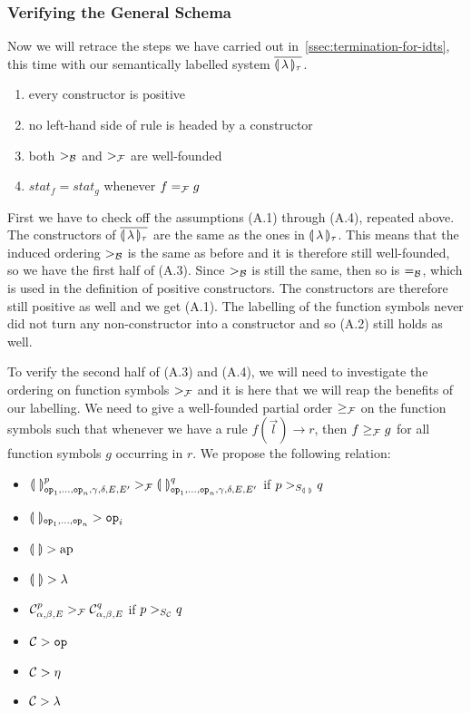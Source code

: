 \subsubsection{Verifying the General Schema}
\label{sssec:general-schema-2}

Now we will retrace the steps we have carried out
in~\ref{ssec:termination-for-idts}, this time with our semantically
labelled system ${\overline{\llparenthesis \, \lambda \, \rrparenthesis_\tau}}$.

\begin{enumerate}
  \item every constructor is positive
  \item no left-hand side of rule is headed by a constructor
  \item both $>_{\mathcal{B}}$ and $>_{\mathcal{F}}$ are well-founded
  \item $stat_f = stat_g$ whenever $f =_{\mathcal{F}} g$
\end{enumerate}

First we have to check off the assumptions (A.1) through (A.4), repeated
above. The constructors of ${\overline{\llparenthesis \, \lambda \, \rrparenthesis_\tau}}$ are the same as the ones in
${\llparenthesis \, \lambda \, \rrparenthesis_\tau}$. This means that the induced ordering $>_{\mathcal{B}}$ is the same as before
and it is therefore still well-founded, so we have the first half of (A.3).
Since $>_{\mathcal{B}}$ is still the same, then so is $=_{\mathcal{B}}$, which is used in the
definition of positive constructors. The constructors are therefore still
positive as well and we get (A.1). The labelling of the function symbols
never did not turn any non-constructor into a constructor and so (A.2)
still holds as well.

To verify the second half of (A.3) and (A.4), we will need to investigate
the ordering on function symbols $>_{\mathcal{F}}$ and it is here that we will reap
the benefits of our labelling. We need to give a well-founded partial order
$\ge_{\mathcal{F}}$ on the function symbols such that whenever we have a rule
$f(\vec{l}) \to r$, then $f \ge_{\mathcal{F}} g$ for all function symbols $g$
occurring in $r$. We propose the following relation:

\begin{itemize}
\item $\llparenthesis \,  \, \rrparenthesis^p_{\mathtt{op}_1, \ldots, \mathtt{op}_n, \gamma, \delta, E, E'}
  >_{\mathcal{F}} \llparenthesis \,  \, \rrparenthesis^q_{\mathtt{op}_1, \ldots, \mathtt{op}_n, \gamma, \delta, E, E'}$
  if $p >_{S_{\llparenthesis \,  \, \rrparenthesis}} q$
\item $\llparenthesis \,  \, \rrparenthesis_{\mathtt{op}_1, \ldots, \mathtt{op}_n} > \mathtt{op}_i$
\item $\llparenthesis \,  \, \rrparenthesis > \operatorname{ap}$
\item $\llparenthesis \,  \, \rrparenthesis > \lambda$
\item $\mathcal{C}^p_{\alpha,\beta,E} >_{\mathcal{F}} \mathcal{C}^q_{\alpha,\beta,E}$ if
  $p >_{S_{\mathcal{C}}} q$
\item $\mathcal{C} > \mathtt{op}$
\item $\mathcal{C} > \eta$
\item $\mathcal{C} > \lambda$
\end{itemize}

